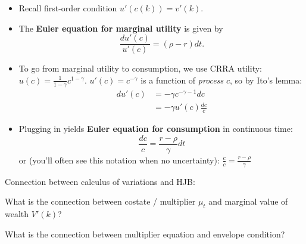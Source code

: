 \documentclass[11pt, aspectratio=169]{beamer}
\newenvironment{witemize}{\itemize\addtolength{\itemsep}{10pt}}{\enditemize}
\begin{document}
\begin{frame}{}

{\small
\begin{itemize}
\item Recall first-order condition $u'(c(k)) = v'(k)$.

\item The \textbf{Euler equation for marginal utility }is given by
\begin{equation*}
	\frac{d u'(c)}{u'(c)} = (\rho - r) dt.
\end{equation*}

\item To go from marginal utility to consumption, we use CRRA utility: $u(c) = \frac{1}{1-\gamma} c^{1-\gamma}$. $u'(c) = c^{-\gamma}$ is a function of \textit{process} $c$, so by Ito's lemma: 
\begin{align*}
	d u'(c) &= -\gamma c^{-\gamma - 1} dc \\
	&= -\gamma u'(c) \frac{dc}{c} 
\end{align*}

\item Plugging in yields \textbf{Euler equation for consumption} in continuous time:
\begin{equation*}
	\frac{dc}{c} = \frac{r - \rho}{\gamma} dt
\end{equation*}
or (you'll often see this notation when no uncertainty): $\frac{\dot c}{c} = \frac{r - \rho}{\gamma}$
\end{itemize}
}
\end{frame}



\begin{frame}{}

Connection between calculus of variations and HJB:
\begin{witemize}
\item What is the connection between costate / multiplier $\mu_t$ and marginal value of wealth $V'(k)$?

\item What is the connection between multiplier equation and envelope condition?
\end{witemize}
\end{frame}
\end{document}
